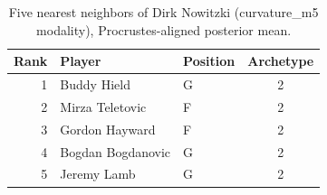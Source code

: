\begin{table}[htbp]
  \centering\small
  \begin{tabular}{rllc}
    \toprule
    Rank & Player & Position & Archetype \\
    \midrule
    1 & Buddy Hield & G & 2 \\
    2 & Mirza Teletovic & F & 2 \\
    3 & Gordon Hayward & F & 2 \\
    4 & Bogdan Bogdanovic & G & 2 \\
    5 & Jeremy Lamb & G & 2 \\
    \bottomrule
  \end{tabular}
  \caption{Five nearest neighbors of Dirk Nowitzki (curvature_m5 modality), Procrustes-aligned posterior mean.}
  \label{tab:Dirk_Nowitzki_neighbors_curvature_m5}
\end{table}

